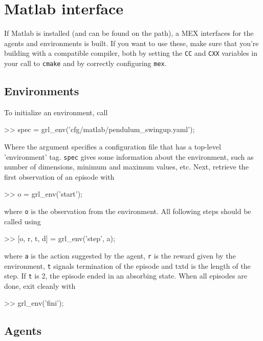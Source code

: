 \documentclass{article}
\newcommand{\txt}[1]{\texttt{#1}}
\newenvironment{code}{\alltt}{\endalltt}
\begin{document}
\section{Matlab interface}

If Matlab is installed (and can be found on the path), a MEX interfaces for
the agents and environments is built. If you want to use these, make sure
that you're building with a compatible compiler, both by setting the
\txt{CC} and \txt{CXX} variables in your call to \txt{cmake} and by correctly
configuring \txt{mex}.

\subsection{Environments}

To initialize an environment, call

\begin{code}
>> spec = grl_env('cfg/matlab/pendulum_swingup.yaml');
\end{code}

Where the argument specifies a configuration file that has a top-level
'environment' tag. \txt{spec} gives some information about the environment,
such as number of dimensions, minimum and maximum values, etc. Next,
retrieve the first observation of an episode with

\begin{code}
>> o = grl_env('start');
\end{code}

where \txt{o} is the observation from the environment. All following
steps should be called using

\begin{code}
>> [o, r, t, d] = grl_env('step', a);
\end{code}

where \txt{a} is the action suggested by the agent, \txt{r} is the reward
given by the environment, \txt{t} signals termination of the episode and 
txt{d} is the length of the step.
If \txt{t} is 2, the episode ended in an absorbing state. When all episodes
are done, exit cleanly with

\begin{code}
>> grl_env('fini');
\end{code}

\subsection{Agents}
\end{document}
